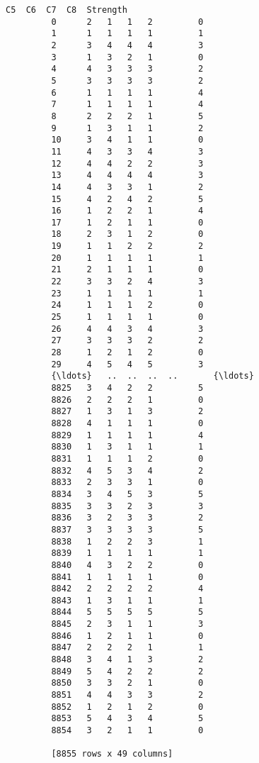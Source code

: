 \documentclass[11pt]{article}
\begin{document}
\begin{Verbatim}[commandchars=\\\{\}]
               C5  C6  C7  C8  Strength  
         0      2   1   1   2         0  
         1      1   1   1   1         1  
         2      3   4   4   4         3  
         3      1   3   2   1         0  
         4      4   3   3   3         2  
         5      3   3   3   3         2  
         6      1   1   1   1         4  
         7      1   1   1   1         4  
         8      2   2   2   1         5  
         9      1   3   1   1         2  
         10     3   4   1   1         0  
         11     4   3   3   4         3  
         12     4   4   2   2         3  
         13     4   4   4   4         3  
         14     4   3   3   1         2  
         15     4   2   4   2         5  
         16     1   2   2   1         4  
         17     1   2   1   1         0  
         18     2   3   1   2         0  
         19     1   1   2   2         2  
         20     1   1   1   1         1  
         21     2   1   1   1         0  
         22     3   3   2   4         3  
         23     1   1   1   1         1  
         24     1   1   1   2         0  
         25     1   1   1   1         0  
         26     4   4   3   4         3  
         27     3   3   3   2         2  
         28     1   2   1   2         0  
         29     4   5   4   5         3  
         {\ldots}   ..  ..  ..  ..       {\ldots}  
         8825   3   4   2   2         5  
         8826   2   2   2   1         0  
         8827   1   3   1   3         2  
         8828   4   1   1   1         0  
         8829   1   1   1   1         4  
         8830   1   3   1   1         1  
         8831   1   1   1   2         0  
         8832   4   5   3   4         2  
         8833   2   3   3   1         0  
         8834   3   4   5   3         5  
         8835   3   3   2   3         3  
         8836   3   2   3   3         2  
         8837   3   3   3   3         5  
         8838   1   2   2   3         1  
         8839   1   1   1   1         1  
         8840   4   3   2   2         0  
         8841   1   1   1   1         0  
         8842   2   2   2   2         4  
         8843   1   3   1   1         1  
         8844   5   5   5   5         5  
         8845   2   3   1   1         3  
         8846   1   2   1   1         0  
         8847   2   2   2   1         1  
         8848   3   4   1   3         2  
         8849   5   4   2   2         2  
         8850   3   3   2   1         0  
         8851   4   4   3   3         2  
         8852   1   2   1   2         0  
         8853   5   4   3   4         5  
         8854   3   2   1   1         0  
         
         [8855 rows x 49 columns]
\end{Verbatim}
        
\end{document}
